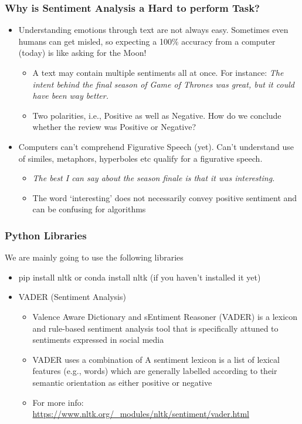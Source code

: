 \documentclass[compress, aspectratio=54]{beamer}
\begin{document}
\begin{frame}

\frametitle{Why is Sentiment Analysis a Hard to perform Task?}
\begin{itemize}
\item Understanding emotions through text are not always easy. Sometimes even humans can get misled, so expecting a 100\% accuracy from a computer (today) is like asking for the Moon!
\begin{itemize}
\item A text may contain multiple sentiments all at once. For instance: \textit{The intent behind the final season of Game of Thrones was great, but it could have been way better.}
\item Two polarities, i.e., Positive as well as Negative. How do we conclude whether the review was Positive or Negative?
\end{itemize}
\item Computers can't  comprehend Figurative Speech (yet). Can't understand use of similes, metaphors, hyperboles etc qualify for a figurative speech.
\begin{itemize}

 \item \textit{The best I can say about the season finale is that it was interesting.}
 \item The word `interesting' does not necessarily convey positive sentiment and can be confusing for algorithms
 \end{itemize}
\end{itemize}
\end{frame}




\begin{frame}
\frametitle{Python Libraries}
We are mainly going to use the following libraries 
\begin{itemize}
\item pip install nltk or conda install nltk (if you haven't installed it yet)
\item VADER (Sentiment Analysis)
\begin{itemize}

\item Valence Aware Dictionary and sEntiment Reasoner (VADER) is a lexicon and rule-based sentiment analysis tool that is specifically attuned to sentiments expressed in social media
\item VADER uses a combination of A sentiment lexicon is a list of lexical features (e.g., words) which are generally labelled according to their semantic orientation as either positive or negative
\item For more info: \url{https://www.nltk.org/_modules/nltk/sentiment/vader.html}
\end{itemize}


\end{itemize}
\end{frame}
\end{document}
